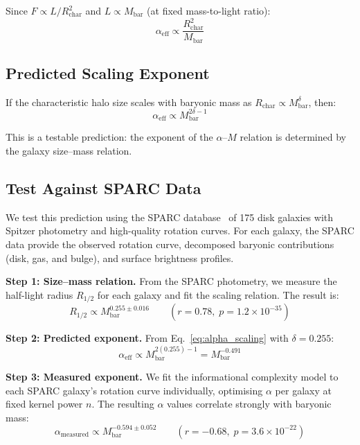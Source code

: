\documentclass[12pt,a4paper]{article}
\begin{document}
Since $F \propto L / R_{\mathrm{char}}^2$ and $L \propto M_{\mathrm{bar}}$ (at fixed mass-to-light ratio):
\begin{equation}
    \alpha_{\mathrm{eff}} \propto \frac{R_{\mathrm{char}}^2}{M_{\mathrm{bar}}}
    \label{eq:alpha_R2M}
\end{equation}

\subsection{Predicted Scaling Exponent}

If the characteristic halo size scales with baryonic mass as $R_{\mathrm{char}} \propto M_{\mathrm{bar}}^\delta$, then:
\begin{equation}
    \alpha_{\mathrm{eff}} \propto M_{\mathrm{bar}}^{2\delta - 1}
    \label{eq:alpha_scaling}
\end{equation}

This is a testable prediction: the exponent of the $\alpha$--$M$ relation is determined by the galaxy size--mass relation.

\subsection{Test Against SPARC Data}
\label{sec:sparc_test}

We test this prediction using the SPARC database~\cite{Lelli2016} of 175 disk galaxies with Spitzer photometry and high-quality rotation curves. For each galaxy, the SPARC data provide the observed rotation curve, decomposed baryonic contributions (disk, gas, and bulge), and surface brightness profiles.

\textbf{Step 1: Size--mass relation.} From the SPARC photometry, we measure the half-light radius $R_{1/2}$ for each galaxy and fit the scaling relation. The result is:
\begin{equation}
    R_{1/2} \propto M_{\mathrm{bar}}^{0.255 \pm 0.016} \qquad (r = 0.78, \; p = 1.2 \times 10^{-35})
\end{equation}

\textbf{Step 2: Predicted exponent.} From Eq.~\eqref{eq:alpha_scaling} with $\delta = 0.255$:
\begin{equation}
    \alpha_{\mathrm{eff}} \propto M_{\mathrm{bar}}^{2(0.255) - 1} = M_{\mathrm{bar}}^{-0.491}
    \label{eq:predicted_exponent}
\end{equation}

\textbf{Step 3: Measured exponent.} We fit the informational complexity model to each SPARC galaxy's rotation curve individually, optimising $\alpha$ per galaxy at fixed kernel power $n$. The resulting $\alpha$ values correlate strongly with baryonic mass:
\begin{equation}
    \alpha_{\mathrm{measured}} \propto M_{\mathrm{bar}}^{-0.594 \pm 0.052} \qquad (r = -0.68, \; p = 3.6 \times 10^{-22})
    \label{eq:measured_exponent}
\end{equation}
\end{document}
